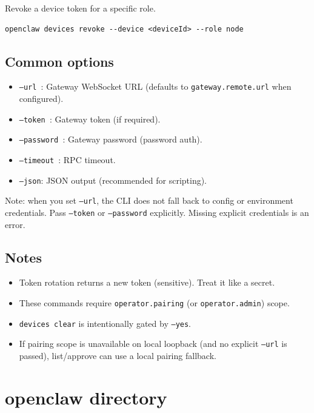 Revoke a device token for a specific role.

\begin{lstlisting}
openclaw devices revoke --device <deviceId> --role node
\end{lstlisting}


\subsection{Common options}


\begin{itemize}
  \item \texttt{--url }: Gateway WebSocket URL (defaults to \texttt{gateway.remote.url} when configured).
  \item \texttt{--token }: Gateway token (if required).
  \item \texttt{--password }: Gateway password (password auth).
  \item \texttt{--timeout }: RPC timeout.
  \item \texttt{--json}: JSON output (recommended for scripting).
\end{itemize}


Note: when you set \texttt{--url}, the CLI does not fall back to config or environment credentials.
Pass \texttt{--token} or \texttt{--password} explicitly. Missing explicit credentials is an error.

\subsection{Notes}


\begin{itemize}
  \item Token rotation returns a new token (sensitive). Treat it like a secret.
  \item These commands require \texttt{operator.pairing} (or \texttt{operator.admin}) scope.
  \item \texttt{devices clear} is intentionally gated by \texttt{--yes}.
  \item If pairing scope is unavailable on local loopback (and no explicit \texttt{--url} is passed), list/approve can use a local pairing fallback.
\end{itemize}



\clearpage

\section{openclaw directory}


